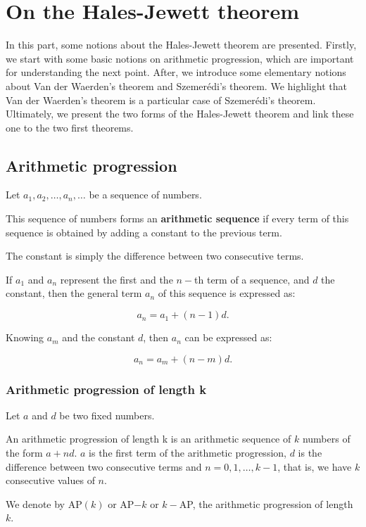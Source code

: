 \chapter{On the Hales-Jewett theorem}

In this part, some notions about the Hales-Jewett theorem are presented. Firstly, we start with some basic notions on arithmetic progression, which are important for understanding the next point. After, we introduce some elementary notions about  Van der Waerden’s theorem and  Szemerédi's theorem. We highlight that  Van der Waerden's theorem is a particular case of Szemerédi's theorem. Ultimately, we present the two forms of the Hales-Jewett theorem and link these one to the two first theorems.

\section{Arithmetic progression}


\begin{defn}
Let $a_1, a_2, \ldots, a_n, \ldots$ be a sequence of numbers.  

This sequence of numbers forms an \textbf{arithmetic sequence} if every term of this sequence is obtained by adding a constant to the previous term.
\end{defn}
The constant is simply the difference between two consecutive terms.

If $a_1$ and $a_n$ represent the first and the $n-$th term of a sequence, and $d$ the constant, then the general term $a_n$ of this sequence is expressed as:

$$a_n=a_1+(n-1)d.$$

Knowing $a_m$ and the constant $d$, then $a_n$ can be expressed as:
 
$$a_n=a_m+(n-m)d.$$

\subsection{Arithmetic progression of length k}


Let $a$ and $d$ be two fixed numbers.

An arithmetic progression of length k is an arithmetic sequence of $k$ numbers of the form $a+nd.$ $a$ is the first term of the arithmetic progression, $d$ is the difference between two consecutive terms and $n=0,1, \ldots, k-1$, that is, we have $k$ consecutive values of $n.$ 

We denote by AP$(k)$ or AP$-k$ or $k-$AP, the arithmetic progression of length $k.$


